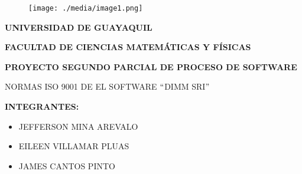 \documentclass[12pt]{article}
\renewcommand{\_}{\kern-1.5pt\textunderscore\kern-1.5pt}
\begin{document}

\begin{figure}[H]
	\begin{Center}
		\texttt{[image: ./media/image1.png]}
	\end{Center}
\end{figure}



\par


\vspace{\baselineskip}
\begin{Center}
\textbf{UNIVERSIDAD DE GUAYAQUIL}
\end{Center}\par

\begin{Center}
\textbf{FACULTAD DE CIENCIAS MATEMÁTICAS Y FÍSICAS}
\end{Center}\par


\vspace{\baselineskip}
\begin{Center}
\textbf{PROYECTO SEGUNDO PARCIAL DE PROCESO DE SOFTWARE}
\end{Center}\par

\begin{Center}
NORMAS ISO 9001 DE EL SOFTWARE $``$DIMM SRI$"$ 
\end{Center}\par


\vspace{\baselineskip}
\begin{Center}
\textbf{INTEGRANTES:}
\end{Center}\par


\vspace{\baselineskip}
\begin{itemize}
	\item JEFFERSON MINA AREVALO\par

	\item EILEEN VILLAMAR PLUAS\par

	\item JAMES CANTOS PINTO 
\end{itemize}\par
\end{document}
